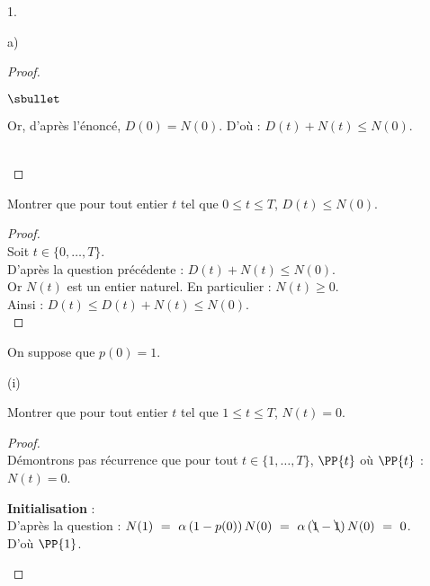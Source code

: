 \begin{noliste}{1.}
\begin{noliste}{a)}
\begin{proof}
\begin{remarkL}{.99}
\begin{noliste}{$\sbullet$}
	  \item Or, d'après l'énoncé, $D(0)=N(0)$. D'où : $D(t)
	  + N(t) \leq N(0)$.
        \end{noliste}
      \end{remarkL}~\\[-1.4cm]
    \end{proof}

    
    \item Montrer que pour tout entier $t$ tel que $0 \leq t \leq T$, 
    $D(t) \leq N(0)$.
    
    \begin{proof}~\\
      Soit $t \in \{0, \ldots, T\}$.\\
      D'après la question précédente : $D(t) + N(t) \leq N(0)$.\\
      Or $N(t)$ est un entier naturel. En particulier : $N(t) \geq 0$.\\
      Ainsi : $D(t) \leq D(t) + N(t) \leq N(0)$.
      ~\\[-1cm]
    \end{proof}

    
    \item On suppose que $p(0)=1$.
    \begin{nonoliste}{(i)}
      \item Montrer que pour tout entier $t$ tel que $1 \leq t \leq T$, 
      $N(t)=0$.
      
      \begin{proof}~\\
        Démontrons pas récurrence que pour tout $t \in \{1, \ldots, 
	T\}$, $\PP{t}$ \quad où \quad $\PP{t}$ : $N(t)=0$.
        \begin{noliste}{\fitem}
	  \item {\bf Initialisation} :\\
	  D'après la question  : $N(1) \ = \ \alpha \, 
	  (1-p(0)) \, N(0) \ = \ \alpha \, (\bcancel{1} - \bcancel{1})
	  \, N(0) \ = \ 0$.\\
	  D'où $\PP{1}$.
	  
	  
	  \newpage
	  

\end{noliste}
\end{proof}
\end{nonoliste}
\end{noliste}
\end{noliste}
